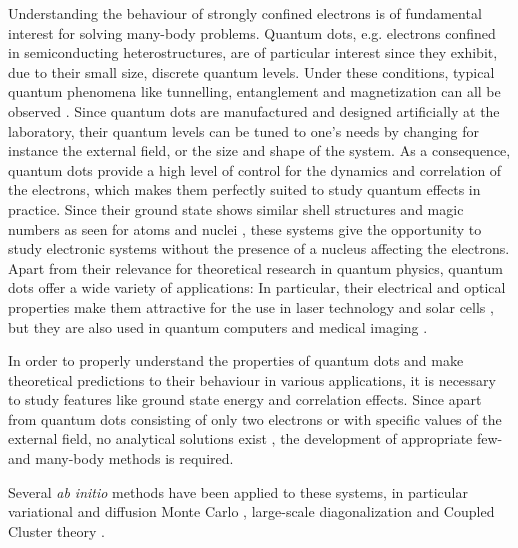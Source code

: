 \documentclass[amsmath, amssymb, aps, floatfix, nofootinbib, preprintnumbers,showpacs, superscriptaddress, twocolumn]{revtex4-1}
\begin{document}
Understanding the behaviour of strongly confined electrons is of fundamental
interest for solving many-body problems.  Quantum dots, e.g. electrons
confined in semiconducting heterostructures, are of particular interest since
they exhibit, due to their small size, discrete quantum levels. Under these
conditions, typical quantum phenomena like tunnelling, entanglement and
magnetization can all be observed \cite{reimann2002,engel1993}.  Since quantum
dots are manufactured and designed artificially at the laboratory, their
quantum levels can be tuned to one's needs by changing for instance the
external field, or the size and shape of the system. As a consequence, quantum
dots provide a high level of control for the dynamics and correlation of the
electrons, which makes them perfectly suited to study quantum effects in
practice.  Since their ground state shows similar shell structures and magic
numbers as seen for atoms and nuclei \cite{tarucha1996}, these systems give
the opportunity to study electronic systems without the presence of a nucleus
affecting the electrons.  Apart from their relevance for theoretical research
in quantum physics, quantum dots offer a wide variety of applications: In
particular, their electrical and optical properties make them attractive for
the use in laser technology \cite{strauf2010,5075760} and solar cells
\cite{jenks:013111,doi:10.1021/cr900289f}, but they are also used in quantum
computers \cite{PhysRevA.57.120} and medical imaging \cite{Ben-Ari02042003}.

In order to properly understand the properties of quantum dots and make
theoretical predictions to their behaviour in various applications, it is
necessary to study features like ground state energy and correlation
effects. Since apart from quantum dots consisting of only two electrons or
with specific values of the external field, no analytical solutions exist
\cite{PhysRevA.48.3561}, the development of appropriate few- and many-body
methods is required.

Several \textit{ab initio} methods have been applied to these systems, in
particular variational and diffusion Monte Carlo \cite{PhysRevB.68.035304,%
  PhysRevB.62.8120,PhysRevB.84.115302,PhysRevB.54.4780}, large-scale
diagonalization \cite{JJAP.36.3924,PhysRevB.56.6428,Kvaalcode,rontani:124102}
and Coupled Cluster theory \cite{PhysRevB.67.045320,heidari:114708,%
  PhysRevB.84.115302}.
\end{document}

